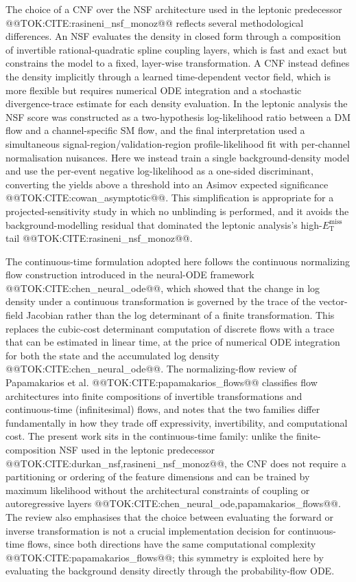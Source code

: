 \documentclass[11pt]{article}
\newcommand{\MET}{\ensuremath{E_{\mathrm{T}}^{\mathrm{miss}}}}
\begin{document}
The choice of a CNF over the NSF architecture used in the leptonic
predecessor @@TOK:CITE:rasineni_nsf_monoz@@ reflects several methodological
differences. An NSF evaluates the density in closed form through a
composition of invertible rational-quadratic spline coupling layers, which
is fast and exact but constrains the model to a fixed, layer-wise
transformation. A CNF instead defines the density implicitly through a
learned time-dependent vector field, which is more flexible but requires
numerical ODE integration and a stochastic divergence-trace estimate for
each density evaluation. In the leptonic analysis the NSF score was
constructed as a two-hypothesis log-likelihood ratio between a DM flow and
a channel-specific SM flow, and the final interpretation used a
simultaneous signal-region/validation-region profile-likelihood fit with
per-channel normalisation nuisances. Here we instead train a single
background-density model and use the per-event negative log-likelihood as a
one-sided discriminant, converting the yields above a threshold into an
Asimov expected significance @@TOK:CITE:cowan_asymptotic@@. This simplification
is appropriate for a projected-sensitivity study in which no unblinding is
performed, and it avoids the background-modelling residual that dominated
the leptonic analysis's high-\MET{} tail @@TOK:CITE:rasineni_nsf_monoz@@.

The continuous-time formulation adopted here follows the continuous
normalizing flow construction introduced in the neural-ODE framework
@@TOK:CITE:chen_neural_ode@@, which showed that the change in log density under a
continuous transformation is governed by the trace of the vector-field
Jacobian rather than the log determinant of a finite transformation. This
replaces the cubic-cost determinant computation of discrete flows with a
trace that can be estimated in linear time, at the price of numerical ODE
integration for both the state and the accumulated log density
@@TOK:CITE:chen_neural_ode@@. The normalizing-flow review of Papamakarios et al.
@@TOK:CITE:papamakarios_flows@@ classifies flow architectures into finite
compositions of invertible transformations and continuous-time
(infinitesimal) flows, and notes that the two families differ
fundamentally in how they trade off expressivity, invertibility, and
computational cost. The present work sits in the continuous-time family:
unlike the finite-composition NSF used in the leptonic predecessor
@@TOK:CITE:durkan_nsf,rasineni_nsf_monoz@@, the CNF does not require a
partitioning or ordering of the feature dimensions and can be trained by
maximum likelihood without the architectural constraints of coupling or
autoregressive layers @@TOK:CITE:chen_neural_ode,papamakarios_flows@@. The
review also emphasises that the choice between evaluating the forward or
inverse transformation is not a crucial implementation decision for
continuous-time flows, since both directions have the same computational
complexity @@TOK:CITE:papamakarios_flows@@; this symmetry is exploited here by
evaluating the background density directly through the probability-flow
ODE.
\end{document}

